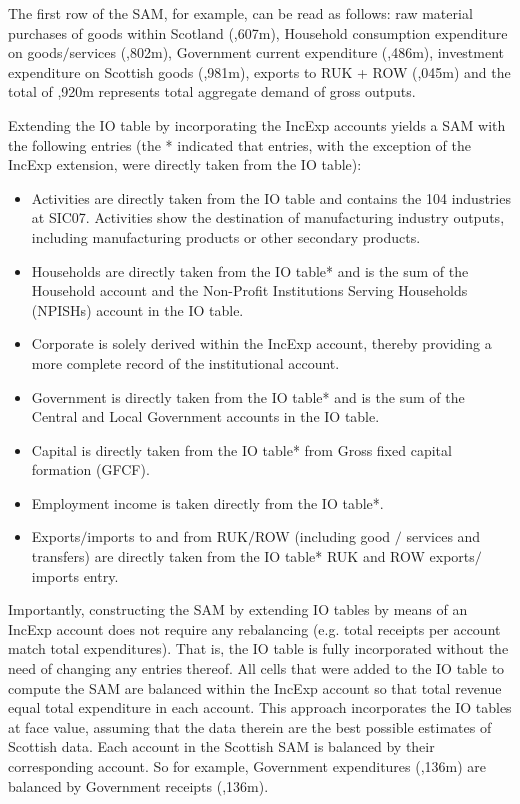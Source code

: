 The first row of the SAM, for example, can be read as follows: raw material purchases of goods within Scotland (,607m), Household consumption expenditure on goods$/$services (,802m), Government current expenditure (,486m), investment expenditure on Scottish goods (,981m), exports to RUK + ROW (,045m) and the total of ,920m represents total aggregate demand of gross outputs.

\bigskip 

Extending the IO table by incorporating the IncExp accounts yields a SAM with the following entries (the * indicated that entries, with the exception of the IncExp extension, were directly taken from the IO table):

\bigskip

\begin{itemize}
    \item Activities are directly taken from the IO table and contains the 104 industries at SIC07. Activities show the destination of manufacturing industry outputs, including manufacturing products or other secondary products.
    \item Households are directly taken from the IO table* and is the sum of the Household account and the Non-Profit Institutions Serving Households (NPISHs) account in the IO table.
    \item Corporate is solely derived within the IncExp account, thereby providing a more complete record of the institutional account. 
    \item Government is directly taken from the IO table* and is the sum of the Central and Local Government accounts in the IO table.
    \item Capital is directly taken from the IO table* from Gross fixed capital formation (GFCF).
    \item Employment income is taken directly from the IO table*.
    \item Exports$/$imports to and from RUK$/$ROW (including good $/$ services and transfers) are directly taken from the IO table* RUK and ROW exports$/$imports entry.
\end{itemize}

\bigskip

Importantly, constructing the SAM by extending IO tables by means of an IncExp account does not require any rebalancing (e.g. total receipts per account match total expenditures). That is, the IO table is fully incorporated without the need of changing any entries thereof. All cells that were added to the IO table to compute the SAM are balanced within the IncExp account so that total revenue equal total expenditure in each account. This approach incorporates the IO tables at face value, assuming that the data therein are the best possible estimates of Scottish data. Each account in the Scottish SAM is balanced by their corresponding account. So for example, Government expenditures (,136m) are balanced by Government receipts (,136m). 


